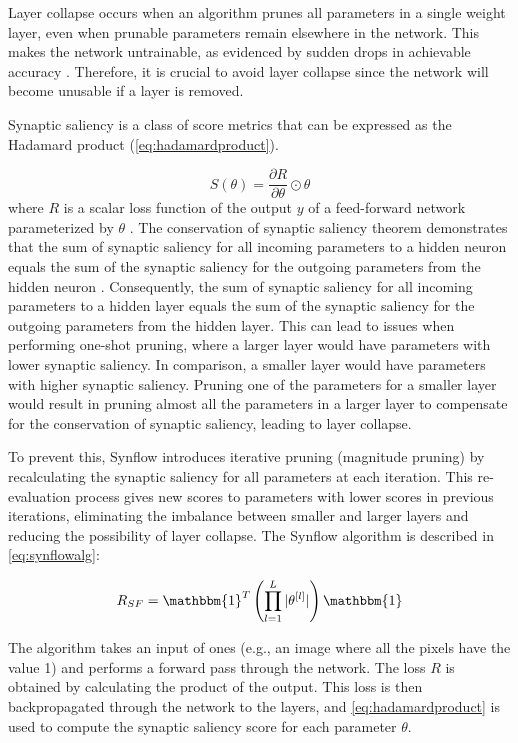 \noindent Layer collapse occurs when an algorithm prunes all parameters in a single weight layer, even when prunable parameters remain elsewhere in the network. This makes the network untrainable, as evidenced by sudden drops in achievable accuracy \autocite{tanaka2020pruning}. Therefore, it is crucial to avoid layer collapse since the network will become unusable if a layer is removed.

\noindent Synaptic saliency is a class of score metrics that can be expressed as the Hadamard product (\cref{eq:hadamardproduct}).

\begin{equation}
S(\theta) = \frac{\partial R}{\partial \theta} \odot \theta
\label{eq:hadamardproduct}
\end{equation}
where $R$ is a scalar loss function of the output $y$ of a feed-forward network parameterized by $\theta$ \autocite{tanaka2020pruning}. The conservation of synaptic saliency theorem demonstrates that the sum of synaptic saliency for all incoming parameters to a hidden neuron equals the sum of the synaptic saliency for the outgoing parameters from the hidden neuron \autocite{tanaka2020pruning}. Consequently, the sum of synaptic saliency for all incoming parameters to a hidden layer equals the sum of the synaptic saliency for the outgoing parameters from the hidden layer. This can lead to issues when performing one-shot pruning, where a larger layer would have parameters with lower synaptic saliency. In comparison, a smaller layer would have parameters with higher synaptic saliency. Pruning one of the parameters for a smaller layer would result in pruning almost all the parameters in a larger layer to compensate for the conservation of synaptic saliency, leading to layer collapse.

\noindent To prevent this, \gls{Synflow} introduces iterative pruning (magnitude pruning) by recalculating the synaptic saliency for all parameters at each iteration. This re-evaluation process gives new scores to parameters with lower scores in previous iterations, eliminating the imbalance between smaller and larger layers and reducing the possibility of layer collapse.
\noindent The \gls{Synflow} algorithm is described in \cref{eq:synflowalg}:

\begin{equation}\label{eq:synflowalg}
R_{SF} = \mathbbm{1}^T \left( \prod^L_{l=1} |\theta^{[l]}| \right) \mathbbm{1}
\end{equation}

The algorithm takes an input of ones (e.g., an image where all the pixels have the value 1) and performs a forward pass through the network. The loss $R$ is obtained by calculating the product of the output. This loss is then backpropagated through the network to the layers, and \cref{eq:hadamardproduct} is used to compute the synaptic saliency score for each parameter $\theta$.


